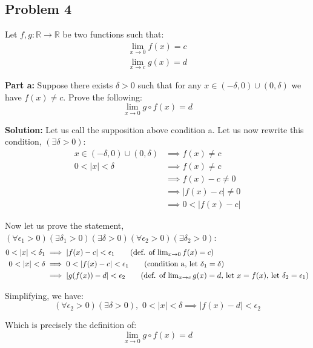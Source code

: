 \documentclass{article}
\newcommand{\R}{\mathbb R}
\begin{document}
\subsection*{Problem 4}
Let $f,g:\R\to\R$ be two functions such that:
\begin{gather*}
  \lim_{x\to0}f(x)=c\\
  \lim_{x\to c}g(x)=d
\end{gather*}
\bigskip

\noindent\textbf{Part a:} Suppose there exists $\delta>0$ such that for any $x\in(-\delta,0)\cup(0,\delta)$ we have $f(x)\not=c$. Prove the following:
\begin{equation*}
  \lim_{x\to 0}g\circ f(x)=d
\end{equation*}
\bigskip

\noindent\textbf{Solution:} Let us call the supposition above condition a. Let us now rewrite this condition, $(\exists\delta>0)$:
\begin{align*}
  x\in(-\delta,0)\cup(0,\delta)&\implies f(x)\not=c\tag{condition a}\\
  0<|x|<\delta&\implies f(x)\not=c\tag{def. of absolute value}\\
  &\implies f(x)-c\not=0\\
  &\implies |f(x)-c|\not=0\\
  &\implies 0<|f(x)-c|\tag{absolute value is nonnegative}
\end{align*}

Now let us prove the statement, $(\forall\epsilon_1>0)(\exists\delta_1>0)(\exists\delta>0)(\forall\epsilon_2>0)(\exists\delta_2>0)$:
\begin{align*}
  0<|x|<\delta_1&\implies|f(x)-c|<\epsilon_1\tag{def. of $\lim_{x\to0}f(x)=c$}\\
  0<|x|<\delta&\implies0<|f(x)-c|<\epsilon_1\tag{condition a, let $\delta_1=\delta$}\\
  &\implies |g(f(x))-d|<\epsilon_2\tag{def. of $\lim_{x\to c}g(x)=d$, let $x=f(x)$, let $\delta_2=\epsilon_1$}
\end{align*}

Simplifying, we have:
\begin{equation*}
  (\forall\epsilon_2>0)(\exists\delta>0),\,\,0<|x|<\delta\implies|f(x)-d|<\epsilon_2
\end{equation*}

Which is precisely the definition of:
\begin{equation*}
  \lim_{x\to 0}g\circ f(x)=d
\end{equation*}
\bigskip
\end{document}
